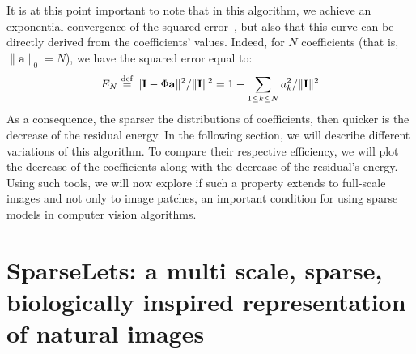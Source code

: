 \documentclass[a4paper, 11pt]{book}
\newcommand{\image}{\mathbf{I}} %
\newcommand{\dico}{\Phi} %
\newcommand{\coef}{\mathbf{a}} %
\newcommand{\eqdef}{\stackrel{\rm def}{=}}%
\begin{document}
It is at this point important to note that in this algorithm,
we achieve an exponential convergence of the squared error~\citep[p.~422]{Mallat98},
but also that this curve can be directly derived from the coefficients' values.
Indeed, for $N$ coefficients (that is, $\| \coef \|_0 = N$), we have the squared error equal to:
\begin{equation}%
E_N \eqdef \| \image - \dico\coef  \| ^2  / \| \image \| ^2 =  1 - \sum_{1\leq k\leq N} a_{k}^2 / \| \image \| ^2%
\label{eq:error}%
\end{equation}%
As a consequence, the sparser the distributions of coefficients, then quicker is the decrease of the residual energy.
In the following section, we will describe different variations of this algorithm. To compare their respective efficiency,
we will plot the decrease of the coefficients along with the decrease of the residual's energy. %
Using such tools, we will now explore if such a property extends to full-scale images and not only to image patches,
an important condition for using sparse models in computer vision algorithms.
%
\section{SparseLets: a multi scale, sparse, biologically inspired representation of natural images}
\label{sec:sparselet}
\end{document}
